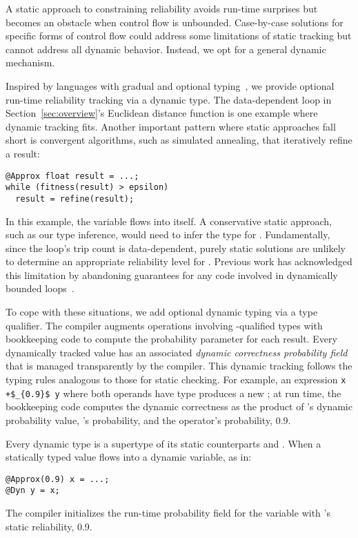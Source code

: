 {A static approach to constraining reliability avoids run-time surprises but
becomes an obstacle when control flow is unbounded.
Case-by-case solutions for specific forms of control flow could address some
limitations of static tracking but cannot address all dynamic behavior.
Instead, we opt for a general dynamic mechanism.

Inspired by languages with gradual and optional typing~\cite{gradualfp},
we provide optional run-time reliability tracking via a dynamic type.
The data-dependent loop in Section~\ref{sec:overview}'s Euclidean
distance function is one example where dynamic tracking fits.
Another important pattern where static approaches fall short is convergent
algorithms, such as simulated annealing, that iteratively refine a result:
%
\begin{lstlisting}
@Approx float result = ...;
while (fitness(result) > epsilon)
  result = refine(result);
\end{lstlisting}
%
In this example, the  variable flows into itself.
A conservative static approach, such as our type inference, would need to infer
the type  for .
Fundamentally, since the loop's trip count is data-dependent, purely static
solutions are unlikely to determine an appropriate reliability level for
.
Previous work has acknowledged this limitation by abandoning guarantees for
any code involved in dynamically bounded loops~\cite{rely}.

To cope with these situations, we add optional dynamic typing via a
 type qualifier.
The compiler augments operations involving -qualified types with
bookkeeping code to compute the probability parameter for each result.
Every dynamically tracked value has an associated \emph{dynamic correctness
probability field} that is managed transparently by the compiler.
This dynamic tracking follows the typing rules analogous to those for static
checking.
For example, an expression \lstinline!x +$_{0.9}$ y! where both operands have type
 produces a new ; at run time, the
bookkeeping code computes the dynamic correctness as the product of 's
dynamic probability value, 's probability, and the operator's
probability, 0.9.

Every dynamic type  is a supertype of its static
counterparts  and .
When a statically typed value flows into a dynamic variable, as in:
%
\begin{lstlisting}
@Approx(0.9) x = ...;
@Dyn y = x;
\end{lstlisting}
%
The compiler initializes the run-time probability field for the variable
 with 's static reliability, 0.9.

}
